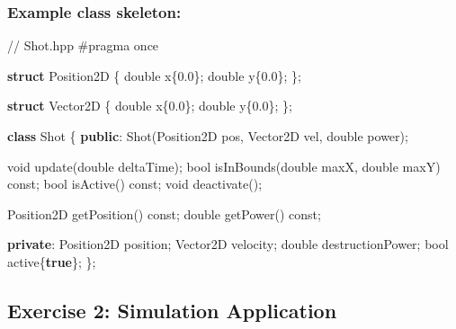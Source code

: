 \documentclass[
]{article}
\newenvironment{Shaded}{\begin{snugshade}}{\end{snugshade}}
\newcommand{\AttributeTok}[1]{\textcolor[rgb]{0.40,0.45,0.13}{#1}}
\newcommand{\CommentTok}[1]{\textcolor[rgb]{0.37,0.37,0.37}{#1}}
\newcommand{\DataTypeTok}[1]{\textcolor[rgb]{0.68,0.00,0.00}{#1}}
\newcommand{\FloatTok}[1]{\textcolor[rgb]{0.68,0.00,0.00}{#1}}
\newcommand{\KeywordTok}[1]{\textcolor[rgb]{0.00,0.23,0.31}{\textbf{#1}}}
\newcommand{\NormalTok}[1]{\textcolor[rgb]{0.00,0.23,0.31}{#1}}
\newcommand{\OperatorTok}[1]{\textcolor[rgb]{0.37,0.37,0.37}{#1}}
\newcommand{\PreprocessorTok}[1]{\textcolor[rgb]{0.68,0.00,0.00}{#1}}
\begin{document}
\subsubsection{Example class skeleton:}\label{example-class-skeleton}

\begin{Shaded}
\begin{Highlighting}[]
\CommentTok{// Shot.hpp}
\PreprocessorTok{\#pragma once}

\KeywordTok{struct}\NormalTok{ Position2D }\OperatorTok{\{}
    \DataTypeTok{double}\NormalTok{ x}\OperatorTok{\{}\FloatTok{0.0}\OperatorTok{\};}
    \DataTypeTok{double}\NormalTok{ y}\OperatorTok{\{}\FloatTok{0.0}\OperatorTok{\};}
\OperatorTok{\};}

\KeywordTok{struct}\NormalTok{ Vector2D }\OperatorTok{\{}
    \DataTypeTok{double}\NormalTok{ x}\OperatorTok{\{}\FloatTok{0.0}\OperatorTok{\};}
    \DataTypeTok{double}\NormalTok{ y}\OperatorTok{\{}\FloatTok{0.0}\OperatorTok{\};}
\OperatorTok{\};}

\KeywordTok{class}\NormalTok{ Shot }\OperatorTok{\{}
\KeywordTok{public}\OperatorTok{:}
\NormalTok{    Shot}\OperatorTok{(}\NormalTok{Position2D pos}\OperatorTok{,}\NormalTok{ Vector2D vel}\OperatorTok{,} \DataTypeTok{double}\NormalTok{ power}\OperatorTok{);}
    
    \DataTypeTok{void}\NormalTok{ update}\OperatorTok{(}\DataTypeTok{double}\NormalTok{ deltaTime}\OperatorTok{);}
    \DataTypeTok{bool}\NormalTok{ isInBounds}\OperatorTok{(}\DataTypeTok{double}\NormalTok{ maxX}\OperatorTok{,} \DataTypeTok{double}\NormalTok{ maxY}\OperatorTok{)} \AttributeTok{const}\OperatorTok{;}
    \DataTypeTok{bool}\NormalTok{ isActive}\OperatorTok{()} \AttributeTok{const}\OperatorTok{;}
    \DataTypeTok{void}\NormalTok{ deactivate}\OperatorTok{();}
    
\NormalTok{    Position2D getPosition}\OperatorTok{()} \AttributeTok{const}\OperatorTok{;}
    \DataTypeTok{double}\NormalTok{ getPower}\OperatorTok{()} \AttributeTok{const}\OperatorTok{;}
    
\KeywordTok{private}\OperatorTok{:}
\NormalTok{    Position2D position}\OperatorTok{;}
\NormalTok{    Vector2D velocity}\OperatorTok{;}
    \DataTypeTok{double}\NormalTok{ destructionPower}\OperatorTok{;}
    \DataTypeTok{bool}\NormalTok{ active}\OperatorTok{\{}\KeywordTok{true}\OperatorTok{\};}
\OperatorTok{\};}
\end{Highlighting}
\end{Shaded}

\subsection{Exercise 2: Simulation
Application}\label{exercise-2-simulation-application}
\end{document}
